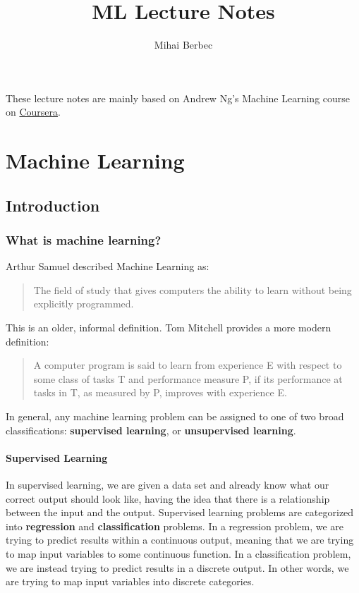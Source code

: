 \documentclass[a4paper,11pt]{report}
\begin{document}
\title{ML Lecture Notes}
\author{Mihai Berbec}
\maketitle

These lecture notes are mainly based on Andrew Ng's Machine Learning course on \href{https://www.coursera.org/learn/machine-learning/}{Coursera}.

\tableofcontents

\part{Machine Learning}

\chapter{Introduction}

\section{What is machine learning?}

Arthur Samuel described Machine Learning as:
\begin{quote}
The field of study that gives computers the ability to learn without being explicitly programmed.
\end{quote}

This is an older, informal definition. Tom Mitchell provides a more modern definition:
\begin{quote}
A computer program is said to learn from experience E with respect to some class of tasks T and performance measure P, if its performance at tasks in T, as measured by P, improves with experience E.
\end{quote}

In general, any machine learning problem can be assigned to one of two broad classifications: \textbf{supervised learning}, or \textbf{unsupervised learning}.

\subsection*{Supervised Learning}

In supervised learning, we are given a data set and already know what our correct output should look like, having the idea that there is a relationship between the input and the output.
Supervised learning problems are categorized into \textbf{regression} and \textbf{classification} problems. In a regression problem, we are trying to predict results within a continuous output, meaning that we are trying to map input variables to some continuous function. In a classification problem, we are instead trying to predict results in a discrete output. In other words, we are trying to map input variables into discrete categories.
\end{document}

